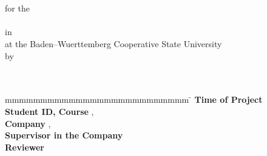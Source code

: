 \begin{titlepage}
	\enlargethispage{20mm}
	\begin{center}
	  \vspace*{12mm}	{\LARGE\bf \titel }\\
	  \vspace*{12mm}	{\large\bf \arbeit}\\
	  \vspace*{12mm}	for the\\
	  \vspace*{3mm} 	{\bf \abschluss}\\
	  \vspace*{12mm}	in \studiengang\\
	  \vspace*{3mm} 	at the Baden--Wuerttemberg Cooperative State University \dhbw\\
	  \vspace*{12mm}	by\\
	  \vspace*{3mm} 	{\large\bf \autor}\\
	  \vspace*{12mm}	\datumAbgabe\\
	\end{center}
	\vfill
	\begin{spacing}{1.2}
	\begin{tabbing}
		mmmmmmmmmmmmmmmmmmmmmmmmmm     \= \kill
		\textbf{Time of Project}  \>  \zeitraum\\
		\textbf{Student ID, Course}  \>  \matrikelnr, \kurs\\
		\textbf{Company}      \>  \firma, \firmenort\\
		\textbf{Supervisor in the Company}              \>  \betreuer\\
		\textbf{Reviewer}             \>  \gutachter
	\end{tabbing}
	\end{spacing}
\end{titlepage}